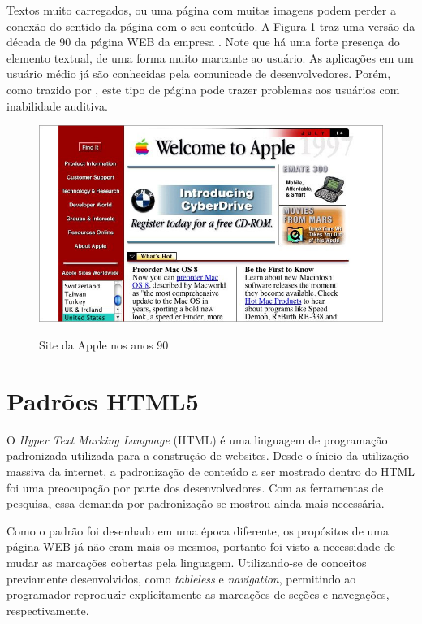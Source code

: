 \documentclass[
	12pt,				%
	oneside,			%
	a4paper,			%
	english,			%
	brazil				%
	]{abntex2ppgsi}
\begin{document}
Textos muito carregados, ou uma página com muitas imagens podem perder a conexão do sentido da página com o seu conteúdo. A Figura \ref{fig:apple} traz uma versão da década de 90 da página WEB da empresa . Note que há uma forte presença do elemento textual, de uma forma muito marcante ao usuário. As aplicações em um usuário médio já são conhecidas pela comunicade de desenvolvedores. Porém, como trazido por , este tipo de página pode trazer problemas aos usuários com inabilidade auditiva. 

\begin{figure}[htbp]
	\centering
	\caption{Site da Apple nos anos 90}
	\includegraphics[scale=0.5]{apple.jpg}
	\label{fig:apple}
\end{figure}
 

\section{Padrões HTML5}

O \textit{Hyper Text Marking Language} (HTML) é uma linguagem de programação padronizada utilizada para a construção de websites. Desde o ínicio da utilização massiva da internet, a padronização de conteúdo a ser mostrado dentro do HTML foi uma preocupação por parte dos desenvolvedores. Com as ferramentas de pesquisa, essa demanda por padronização se mostrou ainda mais necessária.

Como o padrão foi desenhado em uma época diferente, os propósitos de uma página WEB já não eram mais os mesmos, portanto foi visto a necessidade de mudar as marcações cobertas pela linguagem. Utilizando-se de conceitos previamente desenvolvidos, como \textit{tableless} \cite{tableless} e \textit{navigation}, permitindo ao programador reproduzir explicitamente as marcações de seções e navegações, respectivamente. 
\end{document}
